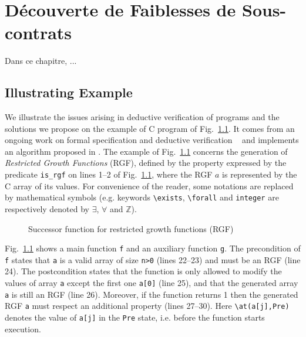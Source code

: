 
\chapter{Découverte de Faiblesses de Sous-contrats}
\label{sec:swd}

\chapterintro

Dans ce chapitre, ...



\section{Illustrating Example}
\label{subsec:example}

We illustrate the issues arising in deductive verification of programs and the
solutions we propose on the example of C program of
Fig.~\ref{fig:rgf1}. It comes from an ongoing work on formal specification and
deductive verification
~\cite{Genestier/TAP15}
and implements an
algorithm proposed in \cite[page 235]{Arndt/10}.
The example of Fig.~\ref{fig:rgf1} 
concerns the generation of
\emph{Restricted Growth Functions} (RGF),
defined by the property expressed by the \acsl
predicate \lstinline{is_rgf} on lines 1--2 of Fig.~\ref{fig:rgf1}, where the RGF
$a$ is represented by the C array
of its values. 
For convenience of the reader, 
some \acsl notations are  replaced by mathematical symbols
(e.g. keywords \lstinline[style=c]{\exists}, \lstinline[style=c]{\forall} and
\lstinline[style=c]{integer} are respectively denoted by $\exists$, $\forall$ and $\mathbb{Z}$).


\begin{figure}[tb]
  \centering
  
  \caption{Successor function for restricted growth functions (RGF)
    \label{fig:rgf1}}
\end{figure}


Fig.~\ref{fig:rgf1} shows a main function \lstinline{f} 
and an auxiliary function \lstinline{g}.
The precondition of \lstinline{f} states that \lstinline{a} is a valid array 
of size  \lstinline{n>0} (lines 22--23) and must be an RGF (line 24).
The postcondition states 
that the function is only allowed to modify the values of array \lstinline{a} except
the first one \lstinline{a[0]} (line 25), 
and that the generated array \lstinline{a} is still an RGF (line 26).
Moreover, if the function returns 1 then the generated RGF \lstinline{a} must
respect an additional property
(lines 27--30).
Here \lstinline{\at(a[j],Pre)} denotes the value of \lstinline{a[j]} in the 
\lstinline{Pre} state, i.e. before the function starts execution.



